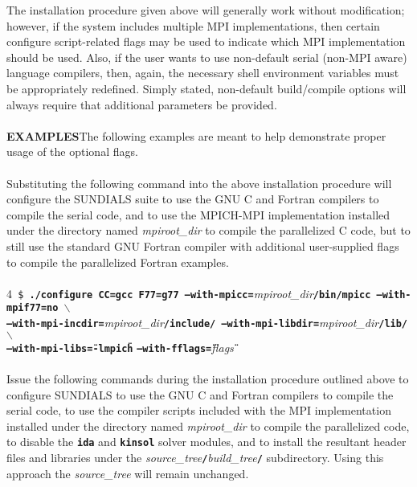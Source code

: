 The installation procedure given above will generally work without modification; however, if the system includes multiple \small MPI \normalsize implementations, then certain configure script-related flags may be used to indicate which \small MPI \normalsize implementation should be used.  Also, if the user wants to use non-default serial (non-\small MPI \normalsize aware) language compilers, then, again, the necessary shell environment variables must be appropriately redefined.  Simply stated, non-default build/compile options will always require that additional parameters be provided.
\\
\\ \setlength{\parindent}{0cm}
\small\textbf{EXAMPLES}\normalsize\hspace*{2ex}The following examples are meant to help demonstrate proper usage of the optional flags.
\\
\\
Substituting the following command into the above installation procedure will configure the \small SUNDIALS \normalsize suite to use the \small GNU \normalsize C and Fortran compilers to compile the serial code, and to use the \small MPICH-MPI \normalsize implementation installed under the directory named \textit{mpiroot\_dir} to compile the parallelized C code, but to still use the standard \small GNU \normalsize Fortran compiler with additional user-supplied flags to compile the parallelized Fortran examples.
\\
\\
\small 4\normalsize\texttt{ \$\textbf{ ./configure CC=gcc F77=g77 --with-mpicc=}}\textit{mpiroot\_dir}\texttt{\textbf{/bin/mpicc --with-mpif77=no  $\backslash$}} \\
\hspace*{2ex}\texttt{\textbf{--with-mpi-incdir=}}\textit{mpiroot\_dir}\texttt{\textbf{/include/ --with-mpi-libdir=}}\textit{mpiroot\_dir}\texttt{\textbf{/lib/  $\backslash$}} \\
\hspace*{2ex}\texttt{\textbf{--with-mpi-libs=\"}}\texttt{\textbf{-lmpich}}\texttt{\textbf{\"}} \texttt{\textbf{--with-fflags=\"}}\textit{flags}\texttt{\textbf{\"}}
\\
\\
Issue the following commands during the installation procedure outlined above to configure \small SUNDIALS \normalsize to use the \small GNU \normalsize C and Fortran compilers to compile the serial code, to use the compiler scripts included with the \small MPI \normalsize implementation installed under the directory named \textit{mpiroot\_dir} to compile the parallelized code, to disable the \texttt{\textbf{ida}} and \texttt{\textbf{kinsol}} solver modules, and to install the resultant header files and libraries under the \textit{source\_tree}\texttt{\textbf{/}}\textit{build\_tree}\texttt{\textbf{/}} subdirectory.  Using this approach the \textit{source\_tree} will remain unchanged.
